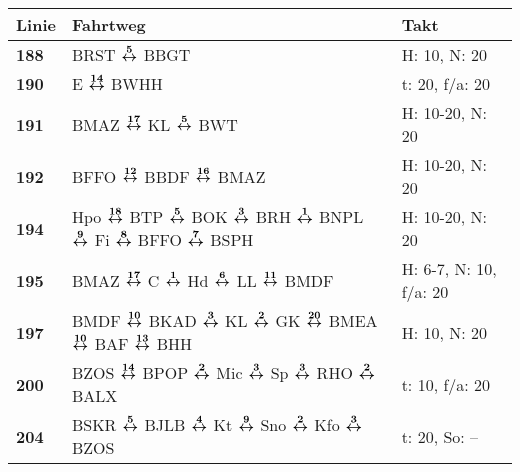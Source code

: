 \begin{minipage}[t]{0.05\textwidth}
\phantom{Tor}
\end{minipage}
\begin{minipage}[t]{0.45\textwidth}
\begin{tabular}{>{\bfseries}L{1.2cm}L{9.0cm}L{3.0cm}}
{\bfseries Linie} & {\bfseries Fahrtweg} & {\bfseries Takt} \\
\hline
\bus{} 188    & BRST $\boldsymbol{\overset{5}{\leftrightarrow}}$ BBGT                                                                                                                                               & H: 10, N: 20               \\
\bus{} 190    & E $\boldsymbol{\overset{14}{\leftrightarrow}}$ BWHH                                                                                                                                                 & t: 20, f/a: 20             \\
\bus{} 191    & BMAZ $\boldsymbol{\overset{17}{\leftrightarrow}}$ KL $\boldsymbol{\overset{5}{\leftrightarrow}}$ BWT                                                                                                                                & H: 10-20, N: 20            \\
\bus{} 192    & BFFO $\boldsymbol{\overset{12}{\leftrightarrow}}$ BBDF $\boldsymbol{\overset{16}{\leftrightarrow}}$ BMAZ                                                                                                                            & H: 10-20, N: 20            \\
\bus{} 194    & Hpo $\boldsymbol{\overset{18}{\leftrightarrow}}$ BTP $\boldsymbol{\overset{5}{\leftrightarrow}}$ BOK $\boldsymbol{\overset{3}{\leftrightarrow}}$ BRH $\boldsymbol{\overset{1}{\leftrightarrow}}$ BNPL $\boldsymbol{\overset{9}{\leftrightarrow}}$ Fi $\boldsymbol{\overset{8}{\leftrightarrow}}$ BFFO $\boldsymbol{\overset{7}{\leftrightarrow}}$ BSPH                                              & H: 10-20, N: 20            \\
\bus{} 195    & BMAZ $\boldsymbol{\overset{17}{\leftrightarrow}}$ C $\boldsymbol{\overset{1}{\leftrightarrow}}$ Hd $\boldsymbol{\overset{6}{\leftrightarrow}}$ LL $\boldsymbol{\overset{11}{\leftrightarrow}}$ BMDF                                                                                                 & H: 6-7, N: 10, f/a: 20     \\
\bus{} 197    & BMDF $\boldsymbol{\overset{10}{\leftrightarrow}}$ BKAD $\boldsymbol{\overset{3}{\leftrightarrow}}$ KL $\boldsymbol{\overset{2}{\leftrightarrow}}$ GK $\boldsymbol{\overset{20}{\leftrightarrow}}$ BMEA $\boldsymbol{\overset{10}{\leftrightarrow}}$ BAF $\boldsymbol{\overset{13}{\leftrightarrow}}$ BHH                                                            & H: 10, N: 20               \\
\bus{} 200    & BZOS $\boldsymbol{\overset{14}{\leftrightarrow}}$ BPOP $\boldsymbol{\overset{2}{\leftrightarrow}}$ Mic $\boldsymbol{\overset{3}{\leftrightarrow}}$ Sp $\boldsymbol{\overset{3}{\leftrightarrow}}$ RHO $\boldsymbol{\overset{2}{\leftrightarrow}}$ BALX                                                                              & t: 10, f/a: 20             \\
\bus{} 204    & BSKR $\boldsymbol{\overset{5}{\leftrightarrow}}$ BJLB $\boldsymbol{\overset{4}{\leftrightarrow}}$ Kt $\boldsymbol{\overset{9}{\leftrightarrow}}$ Sno $\boldsymbol{\overset{2}{\leftrightarrow}}$ Kfo $\boldsymbol{\overset{3}{\leftrightarrow}}$ BZOS                                                                               & t: 20, So: --              \\

\end{tabular}
\end{minipage}
